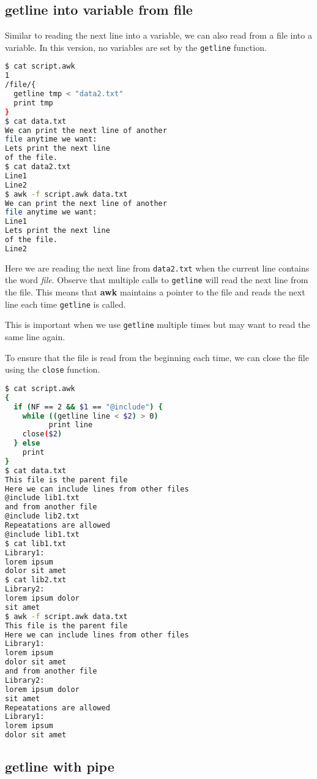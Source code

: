 \subsection{getline into variable from file}

Similar to reading the next line into a variable, we can also read from a file into a variable.
In this version, no variables are set by the \lstinline|getline| function.

\begin{lstlisting}[language=bash]
$ cat script.awk
1
/file/{
  getline tmp < "data2.txt"
  print tmp
}
$ cat data.txt
We can print the next line of another
file anytime we want:
Lets print the next line
of the file.
$ cat data2.txt
Line1
Line2
$ awk -f script.awk data.txt
We can print the next line of another
file anytime we want:
Line1
Lets print the next line
of the file.
Line2
\end{lstlisting}

Here we are reading the next line from \lstinline|data2.txt| when the current line contains the word \textit{file}.
Observe that multiple calls to \lstinline|getline| will read the next line from the file.
This means that \textbf{awk} maintains a pointer to the file and reads the next line each time \lstinline|getline| is called.

This is important when we use \lstinline|getline| multiple times but may want to read the same line again.

To ensure that the file is read from the beginning each time, we can close the file using the \lstinline|close| function.

\begin{lstlisting}[language=bash]
$ cat script.awk
{
  if (NF == 2 && $1 == "@include") {
    while ((getline line < $2) > 0)
          print line
    close($2)
  } else
    print
}
$ cat data.txt
This file is the parent file
Here we can include lines from other files
@include lib1.txt
and from another file
@include lib2.txt
Repeatations are allowed
@include lib1.txt
$ cat lib1.txt
Library1:
lorem ipsum
dolor sit amet
$ cat lib2.txt
Library2:
lorem ipsum dolor
sit amet
$ awk -f script.awk data.txt
This file is the parent file
Here we can include lines from other files
Library1:
lorem ipsum
dolor sit amet
and from another file
Library2:
lorem ipsum dolor
sit amet
Repeatations are allowed
Library1:
lorem ipsum
dolor sit amet
\end{lstlisting}

\subsection{getline with pipe}

